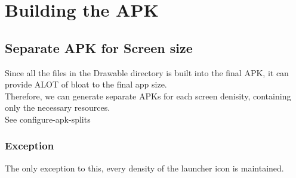\documentclass[]{article}
\begin{document}
\section{Building the APK}
\subsection{Separate APK for Screen size}
Since all the files in the Drawable directory is built into the final APK, it can provide ALOT of bloat to the final app size.\\
Therefore, we can generate separate APKs for each screen denisity, containing only the necessary resources.  
\\
See configure-apk-splits
\subsubsection{Exception}
The only exception to this, every density of the launcher icon is maintained.
\end{document}
